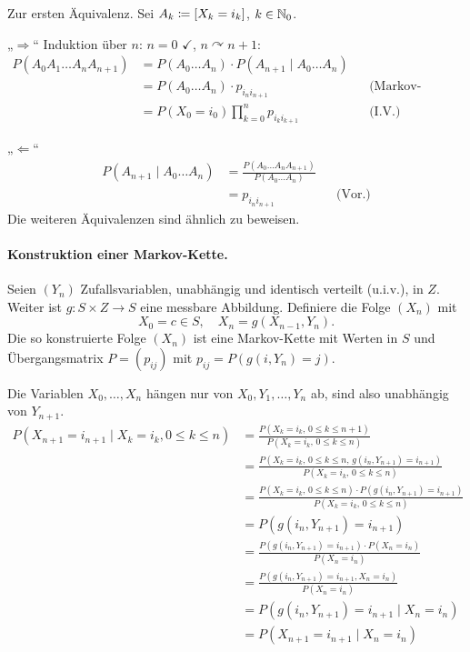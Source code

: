 \documentclass[a4paper,twoside,DIV15,BCOR12mm]{scrbook}
\begin{document}
\begin{beweis}
Zur ersten Äquivalenz. Sei $A_k \da [X_k=i_k]$, $k\in\mathbb{N}_0$.

„$\Longrightarrow$“ Induktion über $n$: $n=0$ $\checkmark$, $n\curvearrowright n+1:$ 
\begin{align*}
P(A_0A_1\ldots A_nA_{n+1}) &= P(A_0\ldots A_n)\cdot P(A_{n+1}\mid A_0\ldots A_n) \\
&= P(A_0\ldots A_n)\cdot p_{i_ni_{n+1}} && \text{(Markov-Eigenschaft)}\\
&= P(X_0=i_0)\prod_{k=0}^n p_{i_ki_{k+1}} && \text{(I.V.)}
\end{align*}

„$\Longleftarrow$“ 
\begin{align*}
P(A_{n+1}\mid A_0\ldots A_n) &= \frac{P(A_0\ldots A_nA_{n+1})}{P(A_0\ldots A_n)} \\
&= p_{i_ni_{n+1}} && \text{(Vor.)}
\end{align*}
Die weiteren Äquivalenzen sind ähnlich zu beweisen.
\end{beweis}

\paragraph{Konstruktion einer Markov-Kette.} Seien $(Y_n)$ Zufallsvariablen, unabhängig und identisch verteilt (u.i.v.), in $Z$. Weiter ist $g:S\times Z\to S$ eine messbare Abbildung. Definiere die Folge $(X_n)$ mit 
\[X_0=c\in S, \quad X_n = g(X_{n-1},Y_n).\]
Die so konstruierte Folge $(X_n)$ ist eine Markov-Kette mit Werten in $S$ und Übergangsmatrix $P=(p_{ij})$ mit $p_{ij} = P(g(i,Y_n)=j)$.

\begin{beweis}
Die Variablen $X_0,\ldots,X_n$ hängen nur von $X_0,Y_1,\ldots,Y_n$ ab, sind also unabhängig von $Y_{n+1}$.
\begin{align*}
P(X_{n+1} = i_{n+1} \mid X_k = i_k, 0\le k\le n) 
&= \frac{P(X_k = i_k,\, 0\le k\le n+1)}{P(X_k = i_k,\, 0\le k\le n)} \\
&= \frac{P(X_k = i_k,\, 0\le k\le n,\, g(i_n,Y_{n+1})=i_{n+1})}{P(X_k = i_k,\, 0\le k\le n)} \\
&= \frac{P(X_k = i_k,\, 0\le k\le n)\cdot P(g(i_n,Y_{n+1})=i_{n+1})}{P(X_k = i_k,\, 0\le k\le n)} \\
&= P(g(i_n,Y_{n+1})=i_{n+1}) \\
&= \frac{P(g(i_n,Y_{n+1})=i_{n+1})\cdot P(X_n=i_n)}{P(X_n =i_n)} \\
&= \frac{P(g(i_n,Y_{n+1})=i_{n+1}, X_n=i_n)}{P(X_n =i_n)} \\
&= P(g(i_n,Y_{n+1})=i_{n+1}\mid X_n=i_n) \\
&= P(X_{n+1} = i_{n+1} \mid X_n=i_n)
\end{align*}
\end{beweis}
\end{document}
